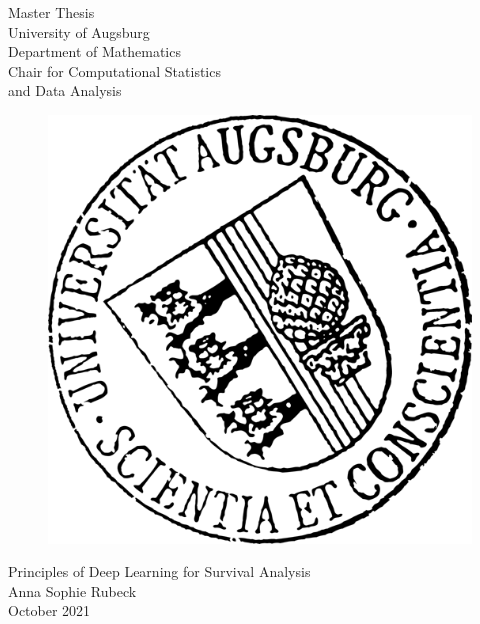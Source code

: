 \documentclass[12pt, a4paper]{scrartcl}
\theoremstyle{definition}
\theoremstyle{plain}
\numberwithin{equation}{section}
\numberwithin{figure}{section}
\numberwithin{table}{section}
\begin{document}
	
	\listoftodos
	\newpage

	\begin{center}
		\Huge Master Thesis\\
		\vspace{0.5cm}
		\LARGE University of Augsburg\\
		\vspace{0.3cm}
		Department of Mathematics\\
		\vspace{0.3cm}
		Chair for Computational Statistics\\ and Data Analysis
		\vspace{0.7cm}
		
		
	\end{center}
	\vspace{0.5cm}
	
	\begin{figure}[h]
		\begin{center}
			\includegraphics[scale=1.35]
			{Uni_Aug_Siegel_32Grad_schwarz.png}
		\end{center}
	\end{figure}
	
	\begin{center}
		\vspace{0.4cm}
		{\LARGE{{Principles of Deep Learning for Survival Analysis}}}\\
		\vspace{2cm}
		\LARGE {Anna Sophie Rubeck}\\
		\vspace{0.9cm}
		\large{October 2021}
	\end{center}
	\newpage
\end{document}
